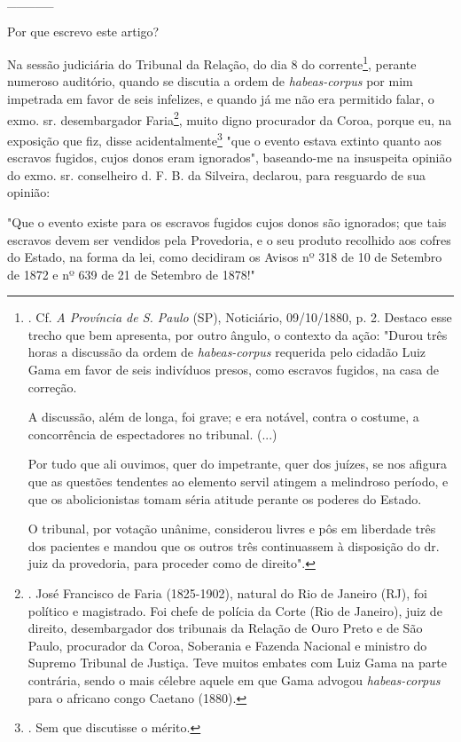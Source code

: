 \_\_\_\_\_

Por que escrevo este artigo?

Na sessão judiciária do Tribunal da Relação, do dia 8 do
corrente\footnote{. Cf. \emph{A Província de S. Paulo} (SP), Noticiário,
  09/10/1880, p. 2. Destaco esse trecho que bem apresenta, por outro
  ângulo, o contexto da ação: "Durou três horas a discussão da ordem de
  \emph{habeas-corpus} requerida pelo cidadão Luiz Gama em favor de seis
  indivíduos presos, como escravos fugidos, na casa de correção.

  A discussão, além de longa, foi grave; e era notável, contra o
  costume, a concorrência de espectadores no tribunal. (...)

  Por tudo que ali ouvimos, quer do impetrante, quer dos juízes, se nos
  afigura que as questões tendentes ao elemento servil atingem a
  melindroso período, e que os abolicionistas tomam séria atitude
  perante os poderes do Estado.

  O tribunal, por votação unânime, considerou livres e pôs em liberdade
  três dos pacientes e mandou que os outros três continuassem à
  disposição do dr. juiz da provedoria, para proceder como de direito".},
perante numeroso auditório, quando se discutia a ordem de
\emph{habeas-corpus} por mim impetrada em favor de seis infelizes, e
quando já me não era permitido falar, o exmo. sr. desembargador
Faria\footnote{. José Francisco de Faria (1825-1902), natural do Rio de
  Janeiro (RJ), foi político e magistrado. Foi chefe de polícia da Corte
  (Rio de Janeiro), juiz de direito, desembargador dos tribunais da
  Relação de Ouro Preto e de São Paulo, procurador da Coroa, Soberania e
  Fazenda Nacional e ministro do Supremo Tribunal de Justiça. Teve
  muitos embates com Luiz Gama na parte contrária, sendo o mais célebre
  aquele em que Gama advogou \emph{habeas-corpus} para o africano congo
  Caetano (1880).}, muito digno procurador da Coroa, porque eu, na
exposição que fiz, disse acidentalmente\footnote{. Sem que discutisse o
  mérito.} "que o evento estava extinto quanto aos escravos fugidos,
cujos donos eram ignorados", baseando-me na insuspeita opinião do exmo.
sr. conselheiro d. F. B. da Silveira, declarou, para resguardo de sua
opinião:

"Que o evento existe para os escravos fugidos cujos donos são ignorados;
que tais escravos devem ser vendidos pela Provedoria, e o seu produto
recolhido aos cofres do Estado, na forma da lei, como decidiram os
Avisos nº 318 de 10 de Setembro de 1872 e nº 639 de 21 de Setembro de
1878!"

